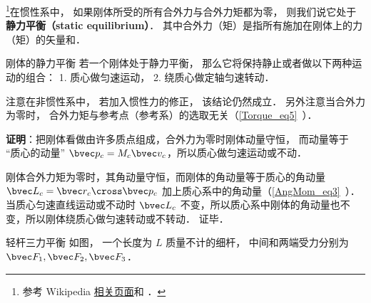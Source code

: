 

\footnote{参考 Wikipedia \href{https://en.wikipedia.org/wiki/Mechanical_equilibrium}{相关页面}和 \cite{新力}．}在惯性系中， 如果刚体所受的所有合外力与合外力矩都为零， 则我们说它处于\textbf{静力平衡（static equilibrium）}． 其中合外力（矩）是指所有施加在刚体上的力（矩）的矢量和．

\begin{theorem}{刚体的静力平衡}
若一个刚体处于静力平衡， 那么它将保持静止或者做以下两种运动的组合： 1. 质心做匀速运动， 2. 绕质心做定轴匀速转动．
\end{theorem}

注意在非惯性系中， 若加入惯性力的修正， 该结论仍然成立． 另外注意当合外力为零时， 合外力矩与参考点（参考系）的选取无关（\autoref{Torque_eq5}~）．

\textbf{证明}：把刚体看做由许多质点组成，合外力为零时刚体动量守恒， 而动量等于 “质心的动量” 
$\bvec p_c = M_c \bvec v_c$，所以质心做匀速运动或不动．

刚体合外力矩为零时，其角动量守恒，而刚体的角动量等于质心的角动量 $\bvec L_c =\bvec r_c\cross \bvec p_c$ 加上质心系中的角动量（\autoref{AngMom_eq3}~）． 当质心匀速直线运动或不动时 $\bvec L_c$ 不变，所以质心系中刚体的角动量也不变，所以刚体绕质心做匀速转动或不转动． 证毕．

\begin{example}{轻杆三力平衡}
如图， 一个长度为 $L$ 质量不计的细杆， 中间和两端受力分别为 $\bvec F_1, \bvec F_2, \bvec F_3$．
\end{example}


